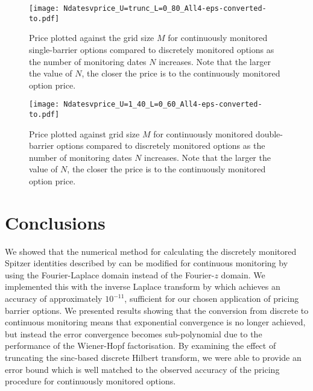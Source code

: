 \documentclass[11pt,a4paper]{article}
\begin{document}
\begin{figure}
\begin{center}
\texttt{[image: Ndatesvprice\_U=trunc\_L=0\_80\_All4-eps-converted-to.pdf]}
\caption{Price plotted against the grid size $M$ for continuously monitored single-barrier options compared to discretely monitored options as the number of monitoring dates $N$ increases. Note that the larger the value of $N$, the closer the price is to the continuously monitored option price.}
\label{fig:Ndatesvprice_U=trunc_L=0_80_All}
\end{center}
\end{figure}

\begin{figure}
\begin{center}
\texttt{[image: Ndatesvprice\_U=1\_40\_L=0\_60\_All4-eps-converted-to.pdf]}
\caption{Price plotted against grid size $M$ for continuously monitored double-barrier options compared to discretely monitored options as the number of monitoring dates $N$ increases. Note that the larger the value of $N$, the closer the price is to the continuously monitored option price.}
\label{fig:Ndatesvprice_U=1_40_L=0_60_All}
\end{center}
\end{figure}

\FloatBarrier
\section{Conclusions}
We showed that the numerical method for calculating the discretely monitored Spitzer identities described by \cite{Fusai2016} can be modified for continuous monitoring by using the Fourier-Laplace domain instead of the Fourier-$z$ domain. We implemented this with the inverse Laplace transform by \cite{Abate1992_2,Abate1995} which achieves an accuracy of approximately $10^{-11}$, sufficient for our chosen application of pricing barrier options. We presented results showing that the conversion from discrete to continuous monitoring means that exponential convergence is no longer achieved, but instead the error convergence becomes sub-polynomial due to the performance of the Wiener-Hopf factorisation.
By examining the effect of truncating the sinc-based discrete Hilbert transform, we were able to provide an error bound which is well matched to the observed accuracy of the pricing procedure for continuously monitored options.
\end{document}

